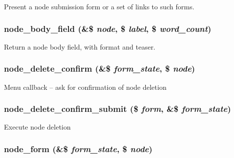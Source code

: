 Present a node submission form or a set of links to such forms. \hypertarget{node_8pages_8inc_9d45bd087e06dbb6570dd7e9f453c7e6}{
\subsubsection[{node\_\-body\_\-field}]{\setlength{\rightskip}{0pt plus 5cm}node\_\-body\_\-field (\&\$ {\em node}, \/  \$ {\em label}, \/  \$ {\em word\_\-count})}}
\label{node_8pages_8inc_9d45bd087e06dbb6570dd7e9f453c7e6}


Return a node body field, with format and teaser. \hypertarget{node_8pages_8inc_ec7f2c58fcb8c1f3f58757781cee4ed3}{
\subsubsection[{node\_\-delete\_\-confirm}]{\setlength{\rightskip}{0pt plus 5cm}node\_\-delete\_\-confirm (\&\$ {\em form\_\-state}, \/  \$ {\em node})}}
\label{node_8pages_8inc_ec7f2c58fcb8c1f3f58757781cee4ed3}


Menu callback -- ask for confirmation of node deletion \hypertarget{node_8pages_8inc_2d744b2bdca2ec49b8eaa0fc7c69e1c3}{
\subsubsection[{node\_\-delete\_\-confirm\_\-submit}]{\setlength{\rightskip}{0pt plus 5cm}node\_\-delete\_\-confirm\_\-submit (\$ {\em form}, \/  \&\$ {\em form\_\-state})}}
\label{node_8pages_8inc_2d744b2bdca2ec49b8eaa0fc7c69e1c3}


Execute node deletion \hypertarget{node_8pages_8inc_0f0be559fe5085e67454b0bd73b1b282}{
\subsubsection[{node\_\-form}]{\setlength{\rightskip}{0pt plus 5cm}node\_\-form (\&\$ {\em form\_\-state}, \/  \$ {\em node})}}
\label{node_8pages_8inc_0f0be559fe5085e67454b0bd73b1b282}



